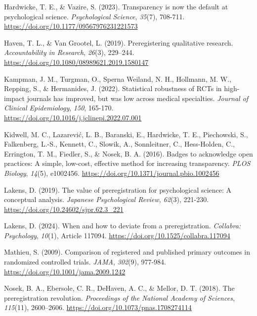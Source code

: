 \documentclass[authordate, empirical]{jote-new-article}
\begin{document}
	Hardwicke, T. E., \& Vazire, S. (2023). Transparency is now the default at psychological science. \emph{Psychological Science}, \emph{35}(7), 708-711. \url{https://doi.org/10.1177/09567976231221573}



	Haven, T. L., \& Van Grootel, L. (2019). Preregistering qualitative research. \emph{Accountability in Research}, \emph{26}(3), 229--244. \url{https://doi.org/10.1080/08989621.2019.1580147}



	Kampman, J. M., Turgman, O., Sperna Weiland, N. H., Hollmann, M. W., Repping, S., \& Hermanides, J. (2022). Statistical robustness of RCTs in high-impact journals has improved, but was low across medical specialties. \emph{Journal of Clinical Epidemiology}, \emph{150}, 165-170. \url{https://doi.org/10.1016/j.jclinepi.2022.07.001}



	Kidwell, M. C., Lazarević, L. B., Baranski, E., Hardwicke, T. E., Piechowski, S., Falkenberg, L.-S., Kennett, C., Slowik, A., Sonnleitner, C., Hess-Holden, C., Errington, T. M., Fiedler, S., \& Nosek, B. A. (2016). Badges to acknowledge open practices: A simple, low-cost, effective method for increasing transparency. \emph{PLOS Biology}, \emph{14}(5), e1002456. \url{https://doi.org/10.1371/journal.pbio.1002456}



	Lakens, D. (2019). The value of preregistration for psychological science: A conceptual analysis. \emph{Japanese Psychological Review, 62}(3), 221-230. \url{https://doi.org/10.24602/sjpr.62.3_221}



	Lakens, D. (2024). When and how to deviate from a preregistration. \emph{Collabra: Psychology}, \emph{10}(1), Article 117094. \url{https://doi.org/10.1525/collabra.117094}



	Mathieu, S. (2009). Comparison of registered and published primary outcomes in randomized controlled trials. \emph{JAMA}, \emph{302}(9), 977-984. \url{https://doi.org/10.1001/jama.2009.1242}



	Nosek, B. A., Ebersole, C. R., DeHaven, A. C., \& Mellor, D. T. (2018). The preregistration revolution. \emph{Proceedings of the National Academy of Sciences}, \emph{115}(11), 2600--2606. \url{https://doi.org/10.1073/pnas.1708274114}
\end{document}
